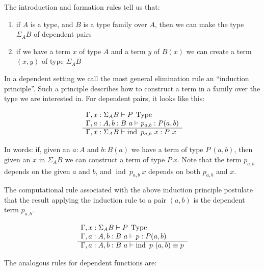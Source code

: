 The introduction and formation rules tell us that: 
\begin{enumerate}
\item if $A$ is a type, and $B$ is a type family over $A$,
  then we can make the type $\Sigma_A B$ of dependent pairs
\item if we have a term $x$ of type $A$ and a term $y$ of $B(x)$ we can create
    a term $(x,y)$ of type $\Sigma_A B$
\end{enumerate}

In a dependent setting we call the most general elimination rule an ``induction
principle''. Such a principle describes how to construct a term in a family
over the type we are interested in. For dependent pairs, it looks like this:

\begin{equation*}
  \begin{array}[t]{l}
    \Gamma, x : \Sigma_A B \vdash P \; \operatorname{Type}\\
    \Gamma, a : A, b : B~a \vdash p_{a,b} : P (a,b)\\
    \hline
    \Gamma, x : \Sigma_A B \vdash \operatorname{ind}~p_{a,b}~x : P~x
  \end{array}
\end{equation*}

In words: if, given an $a : A$ and $b : B (a)$ we have a term of type $P~(a,b)$,
then given an $x$ in $\Sigma_A B$ we can construct a term of type $P~x$. Note
that the term $p_{a,b}$ depends on the given $a$ and $b$, and $\operatorname{ind}~p_{a,b}~x$
depends on both $p_{a,b}$ and $x$.

The computational rule associated with the above induction principle postulate
that the result applying the induction rule to a pair $(a,b)$ is the dependent
term $p_{a,b}$.

\begin{equation*}
  \begin{array}[t]{l}
    \Gamma, x : \Sigma_A B \vdash P \; \operatorname{Type}\\
    \Gamma, a : A, b : B~a \vdash p : P (a,b)\\
    \hline
    \Gamma, a : A, b : B~a \vdash \operatorname{ind}~p~(a,b) \equiv p
  \end{array}
\end{equation*}

The analogous rules for dependent functions are:

